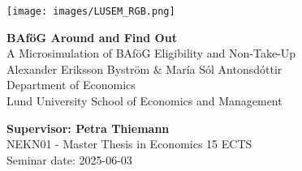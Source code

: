 
\sloppy  %

\texttt{[image: images/LUSEM\_RGB.png]} %

\vspace{2cm}
\begin{center}       
    \vspace*{2cm}
    {\Large \textbf{BAföG Around and Find Out} \\ 
    A Microsimulation of BAföG Eligibility and Non-Take-Up} \\
    \vspace{1cm}
    \large Alexander Eriksson Byström \& María Sól Antonsdóttir \\[0.3cm]
    Department of Economics \\ 
    Lund University School of Economics and Management
\end{center}
\vspace{2cm}

\vfill
\noindent 
\textbf{Supervisor: Petra Thiemann} \\ 
NEKN01 - Master Thesis in Economics 15 ECTS \\ 
Seminar date: 2025-06-03
\thispagestyle{empty}

\fussy  %

\newpage
\tableofcontents
\thispagestyle{empty}



